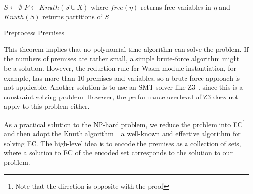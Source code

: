 \begin{algorithm}[t]
\DontPrintSemicolon
{}
$S \gets \emptyset$\;
$P \gets \mathit{Knuth}(S \cup X)$\;
where $\mathit{free}(\eta)$ returns free variables in $\eta$ and
$\mathit{Knuth}(S)$ returns partitions of $S$
\caption{Preprocess Premises}
\label{algo:preminfer}
\end{algorithm}

\medskip
This theorem implies that no polynomial-time algorithm can solve the problem.
If the numbers of premises are rather small, a simple brute-force algorithm might be a solution.
However, the reduction rule for Wasm module instantiation, for example,
has more than 10 premises and variables, so a brute-force approach is not applicable.
Another solution is to use an SMT solver like Z3~\cite{z3},
since this is a constraint solving problem.
However, the performance overhead of Z3 does not apply to this problem either.

As a practical solution to the NP-hard problem,
we reduce the problem into EC\footnote{Note that the direction is opposite with
the proof} and then adopt the Knuth algorithm~\cite{knuth2000dancing},
a well-known and effective algorithm for solving EC.
The high-level idea is to encode the premises as a collection of sets,
where a solution to EC of the encoded set corresponds to the solution to our problem.

